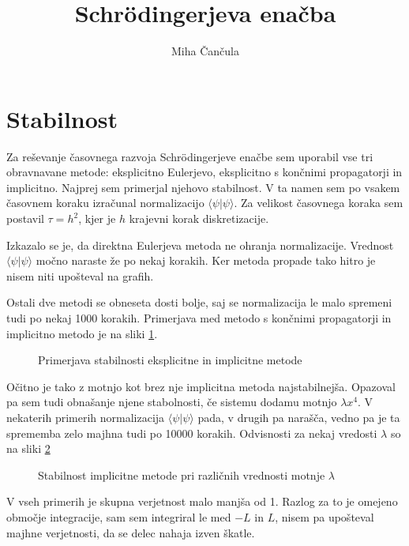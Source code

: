 \documentclass[a4paper,10pt]{article}
\title{Schr\"odingerjeva ena\v cba}
\author{Miha \v Can\v cula}
\begin{document}
\maketitle

\section{Stabilnost}

Za reševanje časovnega razvoja Schr\"odingerjeve enačbe sem uporabil vse tri obravnavane metode: eksplicitno Eulerjevo, eksplicitno s končnimi propagatorji in implicitno. 
Najprej sem primerjal njehovo stabilnost. V ta namen sem po vsakem časovnem koraku izračunal normalizacijo $\langle\psi|\psi\rangle$. 
Za velikost časovnega koraka sem postavil $\tau=h^{2}$, kjer je $h$ krajevni korak diskretizacije. 

Izkazalo se je, da direktna Eulerjeva metoda ne ohranja normalizacije. 
Vrednost $\langle\psi|\psi\rangle$ močno naraste že po nekaj korakih. 
Ker metoda propade tako hitro je nisem niti upošteval na grafih. 

Ostali dve metodi se obneseta dosti bolje, saj se normalizacija le malo spremeni tudi po nekaj 1000 korakih. 
Primerjava med metodo s končnimi propagatorji in implicitno metodo je na sliki \ref{fig:stabilnost}.

\begin{figure}[h]

\caption{Primerjava stabilnosti eksplicitne in implicitne metode}
\label{fig:stabilnost} 
\end{figure}

Očitno je tako z motnjo kot brez nje implicitna metoda najstabilnejša. 
Opazoval pa sem tudi obnašanje njene stabolnosti, če sistemu dodamu motnjo $\lambda x^{4}$.
V nekaterih primerih normalizacija $\langle\psi|\psi\rangle$ pada, v drugih pa narašča, vedno pa je ta sprememba zelo majhna tudi po 10000 korakih. 
Odvisnosti za nekaj vredosti $\lambda$ so na sliki \ref{fig:stabilnost-imp}

\begin{figure}[h]

\caption{Stabilnost implicitne metode pri različnih vrednosti motnje $\lambda$}
\label{fig:stabilnost-imp} 
\end{figure}

V vseh primerih je skupna verjetnost malo manjša od 1. 
Razlog za to je omejeno območje integracije, sam sem integriral le med $-L$ in $L$, nisem pa upošteval majhne verjetnosti, da se delec nahaja izven škatle. 
\end{document}
